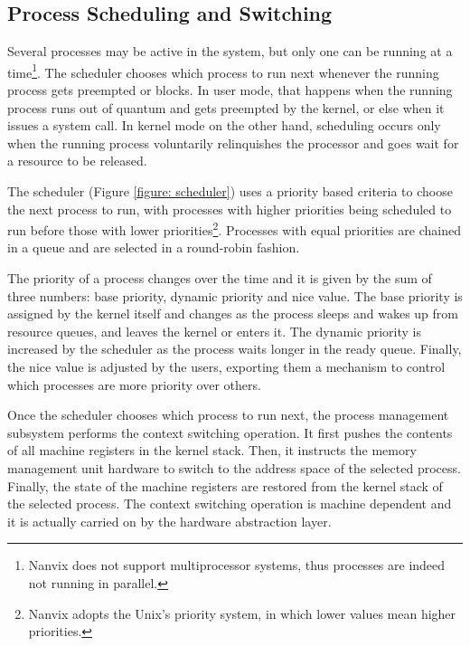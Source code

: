 \subsection{Process Scheduling and Switching}

	Several processes may be active in the system, but only one can
	be running at a time\footnote{Nanvix does not support
	multiprocessor systems, thus processes are indeed not running in
	parallel.}. The scheduler chooses which process to run next
	whenever the running process gets preempted or blocks. In user
	mode, that happens when the running process runs out of quantum
	and gets preempted by the kernel, or else when it issues a
	system call. In kernel mode on the other hand, scheduling occurs
	only when the running process voluntarily relinquishes the
	processor and goes wait for a resource to be released.

	The scheduler (Figure \ref{figure: scheduler}) uses a priority
	based criteria to choose the next process to run, with processes
	with higher priorities being scheduled to run before those with
	lower priorities\footnote{Nanvix adopts the Unix's priority
	system, in which lower values mean higher priorities.}.
	Processes with equal priorities are chained in a queue and are
	selected in a round-robin fashion.

	The priority of a process changes over the time and it is given
	by the sum of three numbers: base priority, dynamic priority and
	nice value. The base priority is assigned by the kernel itself
	and changes as the process sleeps and wakes up from resource
	queues, and leaves the kernel or enters it. The dynamic priority
	is increased by the scheduler as the process waits longer in the
	ready queue. Finally, the nice value is adjusted by the users,
	exporting them a mechanism to control which processes are more
	priority over others.

	Once the scheduler chooses which process to run next, the
	process management subsystem performs the context switching
	operation. It first pushes the contents of all machine registers
	in the kernel stack. Then, it instructs the memory management
	unit hardware to switch to the address space of the selected
	process. Finally, the state of the machine registers are
	restored from the kernel stack of the selected process. The
	context switching operation is machine dependent and it is
	actually carried on by the hardware abstraction layer.

